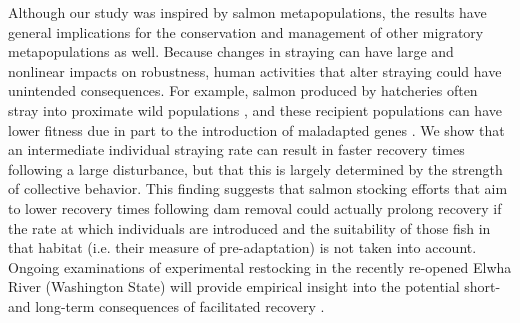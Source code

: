 \documentclass{revtex4}
\begin{document}
% 
Although our study was inspired by salmon metapopulations, the results have general implications for the conservation and management of other migratory metapopulations as well. 
Because changes in straying can have large and nonlinear impacts on robustness, human activities that alter straying could have unintended consequences. 
For example, salmon produced by hatcheries often stray into proximate wild populations \citep{Brenner:2012gl}, and these recipient populations can have lower fitness due in part to the introduction of maladapted genes \citep{Ford:2002ip}. 
We show that an intermediate individual straying rate can result in faster recovery times following a large disturbance, but that this is largely determined by the strength of collective behavior.
This finding suggests that salmon stocking efforts that aim to lower recovery times following dam removal could actually prolong recovery if the rate at which individuals are introduced and the suitability of those fish in that habitat (i.e. their measure of pre-adaptation) is not taken into account.
Ongoing examinations of experimental restocking in the recently re-opened Elwha River (Washington State) will provide empirical insight into the potential short- and long-term consequences of facilitated recovery \citep{Liermann:2017gj}. 

\end{document}
